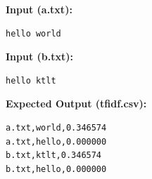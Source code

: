 \textbf{Input (a.txt):}

\begin{lstlisting}
hello world
\end{lstlisting}

\textbf{Input (b.txt):}

\begin{lstlisting}
hello ktlt
\end{lstlisting}

\textbf{Expected Output (tfidf.csv):}

\begin{lstlisting}
a.txt,world,0.346574
a.txt,hello,0.000000
b.txt,ktlt,0.346574
b.txt,hello,0.000000
\end{lstlisting}